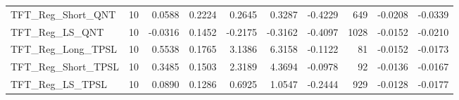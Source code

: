 \begin{tabular}{llrrrrrrrr}
\cline{1-10}
TFT\_Reg\_Short\_QNT & 10 & 0.0588 & 0.2224 & 0.2645 & 0.3287 & -0.4229 & 649 & -0.0208 & -0.0339 \\
\cline{1-10}
TFT\_Reg\_LS\_QNT & 10 & -0.0316 & 0.1452 & -0.2175 & -0.3162 & -0.4097 & 1028 & -0.0152 & -0.0210 \\
\cline{1-10}
TFT\_Reg\_Long\_TPSL & 10 & 0.5538 & 0.1765 & 3.1386 & 6.3158 & -0.1122 & 81 & -0.0152 & -0.0173 \\
\cline{1-10}
TFT\_Reg\_Short\_TPSL & 10 & 0.3485 & 0.1503 & 2.3189 & 4.3694 & -0.0978 & 92 & -0.0136 & -0.0167 \\
\cline{1-10}
TFT\_Reg\_LS\_TPSL & 10 & 0.0890 & 0.1286 & 0.6925 & 1.0547 & -0.2444 & 929 & -0.0128 & -0.0177 \\
\cline{1-10}
\bottomrule
\end{tabular}
